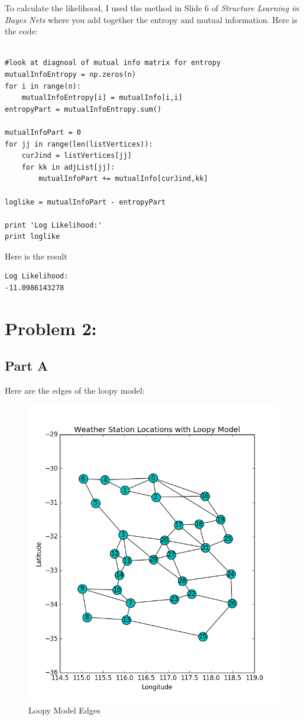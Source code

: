 \documentclass[twoside,11pt]{article}
\theoremstyle{definition}
\begin{document}
To calculate the likelihood, I used the method in Slide 6 of \textit{Structure Learning in Bayes Nets} where you add together the entropy and mutual information. Here is the code:
\begin{lstlisting}

#look at diagnoal of mutual info matrix for entropy
mutualInfoEntropy = np.zeros(n)
for i in range(n):
    mutualInfoEntropy[i] = mutualInfo[i,i]
entropyPart = mutualInfoEntropy.sum()

mutualInfoPart = 0
for jj in range(len(listVertices)):
    curJind = listVertices[jj]
    for kk in adjList[jj]:
        mutualInfoPart += mutualInfo[curJind,kk]

loglike = mutualInfoPart - entropyPart

print 'Log Likelihood:'
print loglike
\end{lstlisting}

Here is the result
\begin{lstlisting}
Log Likelihood:
-11.0986143278
\end{lstlisting}

\newpage

\section*{Problem 2:}

\subsection*{Part A}

Here are the edges of the loopy model:

\begin{figure}[h]
\centering
\includegraphics[width=6in]{loopyModelFigure2.png}
\caption{Loopy Model Edges}
\end{figure}
\end{document}
